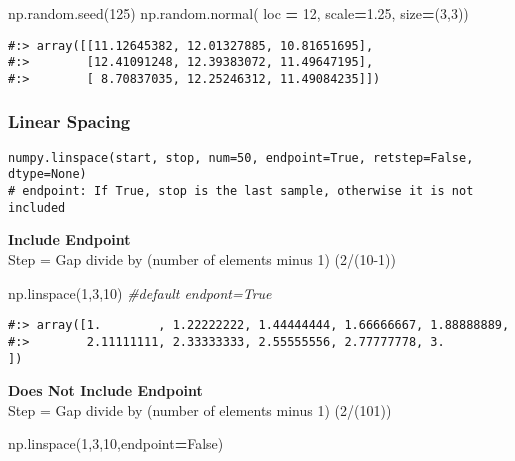 \documentclass[
]{book}
\newenvironment{Shaded}{\begin{snugshade}}{\end{snugshade}}
\newcommand{\CommentTok}[1]{\textcolor[rgb]{0.37,0.37,0.37}{\textit{#1}}}
\newcommand{\DecValTok}[1]{\textcolor[rgb]{0.06,0.06,0.06}{#1}}
\newcommand{\FloatTok}[1]{\textcolor[rgb]{0.06,0.06,0.06}{#1}}
\newcommand{\NormalTok}[1]{#1}
\newcommand{\OperatorTok}[1]{\textcolor[rgb]{0.43,0.43,0.43}{\textbf{#1}}}
\newcommand{\VariableTok}[1]{\textcolor[rgb]{0,0,0}{#1}}
\begin{document}
\begin{Shaded}
\begin{Highlighting}[]
\NormalTok{np.random.seed(}\DecValTok{125}\NormalTok{)}
\NormalTok{np.random.normal( loc }\OperatorTok{=} \DecValTok{12}\NormalTok{, scale}\OperatorTok{=}\FloatTok{1.25}\NormalTok{, size}\OperatorTok{=}\NormalTok{(}\DecValTok{3}\NormalTok{,}\DecValTok{3}\NormalTok{))}
\end{Highlighting}
\end{Shaded}

\begin{verbatim}
#:> array([[11.12645382, 12.01327885, 10.81651695],
#:>        [12.41091248, 12.39383072, 11.49647195],
#:>        [ 8.70837035, 12.25246312, 11.49084235]])
\end{verbatim}

\hypertarget{linear-spacing}{%
\subsubsection{Linear Spacing}\label{linear-spacing}}

\begin{verbatim}
numpy.linspace(start, stop, num=50, endpoint=True, retstep=False, dtype=None)
# endpoint: If True, stop is the last sample, otherwise it is not included
\end{verbatim}

\textbf{Include Endpoint}\\
Step = Gap divide by (number of elements minus 1) (2/(10-1))

\begin{Shaded}
\begin{Highlighting}[]
\NormalTok{np.linspace(}\DecValTok{1}\NormalTok{,}\DecValTok{3}\NormalTok{,}\DecValTok{10}\NormalTok{) }\CommentTok{\#default endpont=True}
\end{Highlighting}
\end{Shaded}

\begin{verbatim}
#:> array([1.        , 1.22222222, 1.44444444, 1.66666667, 1.88888889,
#:>        2.11111111, 2.33333333, 2.55555556, 2.77777778, 3.        ])
\end{verbatim}

\textbf{Does Not Include Endpoint}\\
Step = Gap divide by (number of elements minus 1) (2/(101))

\begin{Shaded}
\begin{Highlighting}[]
\NormalTok{np.linspace(}\DecValTok{1}\NormalTok{,}\DecValTok{3}\NormalTok{,}\DecValTok{10}\NormalTok{,endpoint}\OperatorTok{=}\VariableTok{False}\NormalTok{)}
\end{Highlighting}
\end{Shaded}
\end{document}
